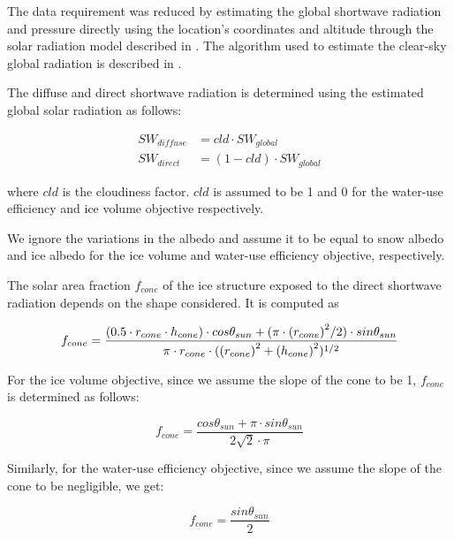 The data requirement was reduced by estimating the global shortwave radiation and pressure directly using the
location's coordinates and altitude through the solar radiation model described in
\citet{holmgrenPvlibPythonPython2018}. The algorithm used to estimate the clear-sky global radiation is
described in \citet{ineichenBroadbandSimplifiedVersion2008}.  

The diffuse and direct shortwave radiation is determined using the estimated global solar radiation as follows:

\begin{equation}
\begin{split}
  SW_{diffuse} &= cld \cdot SW_{global}\\
  SW_{direct} &= (1-cld) \cdot SW_{global}
\end{split}
\end{equation}

where $cld$ is the cloudiness factor. $cld$ is assumed to be 1 and 0 for the water-use efficiency and ice volume
objective respectively.

We ignore the variations in the albedo and assume it to be equal to snow albedo and ice albedo for the  ice
volume and water-use efficiency objective, respectively.

The solar area fraction $f_{cone}$ of the ice structure exposed to the direct shortwave radiation depends on the
shape considered. It is computed as

\begin{equation}
		f_{cone} =\frac{(0.5 \cdot r_{cone} \cdot h_{cone}) \cdot cos \theta_{sun} +(\pi \cdot
			{(r_{cone})}^2/2) \cdot sin \theta_{sun} }{\pi \cdot r_{cone} \cdot ({(r_{cone})}^2+{(h_{cone})}^2)^{1/2}}\\
\end{equation}

For the ice volume objective, since we assume the slope of the cone to be 1, $f_{cone}$ is determined as follows:

\begin{equation}
		f_{cone} =\frac{ cos \theta_{sun} + \pi \cdot sin \theta_{sun} }{2\sqrt{2} \cdot \pi }
\end{equation}

Similarly, for the water-use efficiency objective, since we assume the slope of the cone to be negligible, we get:

\begin{equation}
		f_{cone} =\frac{ sin \theta_{sun} }{2 }
\end{equation}

